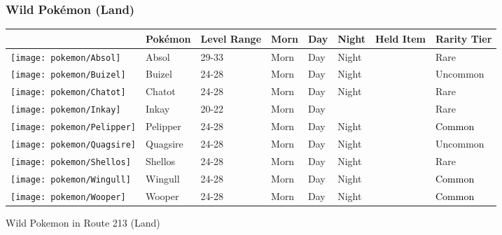 \subsubsection{Wild Pokémon (Land)}%
\label{ssubsec:WildPokmon(Land)}%
\begin{longtable}{||l l l l l l l l||}%
\hline%
\rowcolor{GroundColor}%
&Pokémon&Level Range&Morn&Day&Night&Held Item&Rarity Tier\\%
\hline%
\endhead%
\hline%
\rowcolor{GroundColor}%
\texttt{[image: pokemon/Absol]}&Absol&29{-}33&Morn&Day&Night&&\textcolor{RedOrange}{%
Rare%
}\\%
\hline%
\rowcolor{GroundColor}%
\texttt{[image: pokemon/Buizel]}&Buizel&24{-}28&Morn&Day&Night&&\textcolor{OliveGreen}{%
Uncommon%
}\\%
\hline%
\rowcolor{GroundColor}%
\texttt{[image: pokemon/Chatot]}&Chatot&24{-}28&Morn&Day&Night&&\textcolor{RedOrange}{%
Rare%
}\\%
\hline%
\rowcolor{GroundColor}%
\texttt{[image: pokemon/Inkay]}&Inkay&20{-}22&Morn&Day&&&\textcolor{RedOrange}{%
Rare%
}\\%
\hline%
\rowcolor{GroundColor}%
\texttt{[image: pokemon/Pelipper]}&Pelipper&24{-}28&Morn&Day&Night&&\textcolor{black}{%
Common%
}\\%
\hline%
\rowcolor{GroundColor}%
\texttt{[image: pokemon/Quagsire]}&Quagsire&24{-}28&Morn&Day&Night&&\textcolor{OliveGreen}{%
Uncommon%
}\\%
\hline%
\rowcolor{GroundColor}%
\texttt{[image: pokemon/Shellos]}&Shellos&24{-}28&Morn&Day&Night&&\textcolor{RedOrange}{%
Rare%
}\\%
\hline%
\rowcolor{GroundColor}%
\texttt{[image: pokemon/Wingull]}&Wingull&24{-}28&Morn&Day&Night&&\textcolor{black}{%
Common%
}\\%
\hline%
\rowcolor{GroundColor}%
\texttt{[image: pokemon/Wooper]}&Wooper&24{-}28&Morn&Day&Night&&\textcolor{black}{%
Common%
}\\%
\hline%
\end{longtable}%
\caption{Wild Pokemon in Route 213 (Land)}